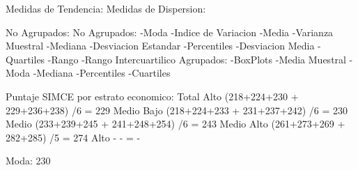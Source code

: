 

Medidas de Tendencia:			Medidas de Dispersion:

No Agrupados:				No Agrupados:
	-Moda					-Indice de Variacion
	-Media					-Varianza Muestral
	-Mediana				-Desviacion Estandar
	-Percentiles				-Desviacion Media
	-Quartiles				-Rango
						-Rango Intercuartilico
Agrupados:					-BoxPlots	
	-Media Muestral				
	-Moda					
	-Mediana				
	-Percentiles				
	-Cuartiles				

Puntaje SIMCE por estrato economico:
							Total     %
Alto		(218+224+230 + 229+236+238) /6	=	229	
Medio Bajo	(218+224+233 + 231+237+242) /6	=	230
Medio		(233+239+245 +	241+248+254) /6	=	243
Medio Alto	(261+273+269 +  282+285) /5	= 	274
Alto		-		-		=	-


Moda: 230
